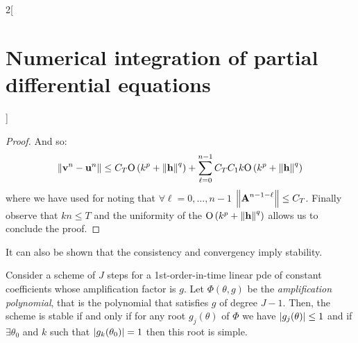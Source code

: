 \documentclass[../../../main_math.tex]{subfiles}
\begin{document}
\begin{multicols}{2}[\section{Numerical integration of partial differential equations}]
\begin{proof}
    And so:
    $$
      \left\|\boldsymbol{\mathrm{v}}^n-\boldsymbol{\mathrm{u}}^n\right\|\leq C_T \mathrm{O}\left(k^p+\left\|\boldsymbol{\mathrm{h}}\right\|^q\right)+\sum_{\ell=0}^{n-1}C_T C_1k\mathrm{O}\left(k^p+\left\|\boldsymbol{\mathrm{h}}\right\|^q\right)
    $$
    where we have used  for noting that $\forall\ell=0,\ldots,n-1$ $\left\|\boldsymbol{\mathrm{A}}^{n-1-\ell}\right\|\leq C_T$.
    Finally observe that $kn\leq T$ and the uniformity of the $\mathrm{O}\left(k^p+\left\|\boldsymbol{\mathrm{h}}\right\|^q\right)$ allows us to conclude the proof.
  \end{proof}
  \begin{remark}
    It can also be shown that the consistency and convergency imply stability.
  \end{remark}
  \begin{theorem}
    Consider a scheme of $J$ steps for a 1st-order-in-time linear pde of constant coefficients whose amplification factor is $g$. Let $\Phi(\theta, g)$ be the \emph{amplification polynomial}, that is the polynomial that satisfies $g$ of degree $J-1$. Then, the scheme is stable if and only if for any root $g_j(\theta)$ of $\Phi$ we have $\abs{g_j(\theta)}\leq 1$ and if $\exists \theta_0$ and $k$ such that $\abs{g_k(\theta_0)}=1$ then this root is simple.
  \end{theorem}
\end{multicols}
\end{document}
